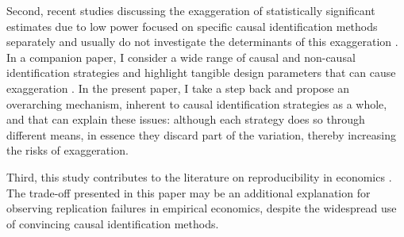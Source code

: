 			Second, recent studies discussing the exaggeration of statistically significant estimates due to low power focused on specific causal identification methods separately and usually do not investigate the determinants of this exaggeration \citep{schell_evaluating_2018, black_simulated_2021, stommes_reliability_2021, young_leverage_2021}.  In a companion paper, I consider a wide range of causal and non-causal identification strategies and highlight tangible design parameters that can cause exaggeration \citep{bagilet_accurately_2023}. In the present paper, I take a step back and propose an overarching mechanism, inherent to causal identification strategies as a whole, and that can explain these issues: although each strategy does so through different means, in essence they discard part of the variation, thereby increasing the risks of exaggeration. %
			
			Third, this study contributes to the literature on reproducibility in economics \citep{camerer_evaluating_2016, ioannidis_power_2017, christensen_transparency_2018, kasy_forking_2021}. The trade-off presented in this paper may be an additional explanation for observing replication failures in empirical economics, despite the widespread use of convincing causal identification methods.

	
	
		
